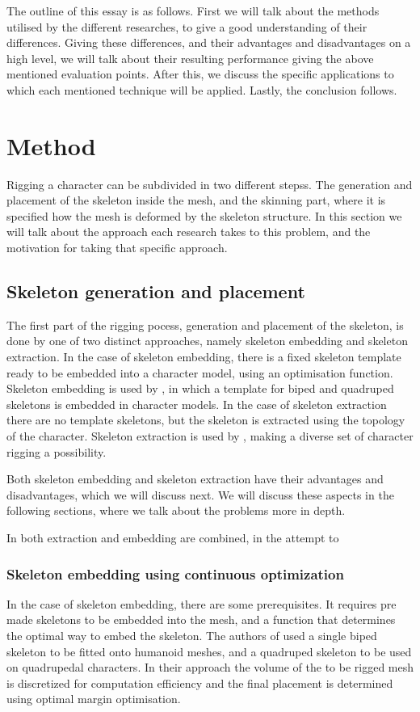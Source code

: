 \documentclass{article}
\begin{document}
The outline of this essay is as follows. First we will talk about the methods
utilised by the different researches, to give a good understanding of their
differences. Giving these differences, and their advantages and disadvantages on
a high level, we will talk about their resulting performance giving the above
mentioned evaluation points. After this, we discuss the specific applications to
which each mentioned technique will be applied. Lastly, the conclusion follows.

\section{Method}
Rigging a character can be subdivided in two different stepss. The generation
and placement of the skeleton inside the mesh, and the skinning part, where it
is specified how the mesh is deformed by the skeleton structure. In this section we will talk
about the approach each research takes to this problem, and the motivation for
taking that specific approach.

\subsection{Skeleton generation and placement}
The first part of the rigging pocess, generation and placement of the skeleton, 
is done by one of two distinct approaches, namely skeleton
embedding and skeleton extraction. In the case of skeleton embedding, there
is a fixed skeleton template ready to be embedded into a character model,
using an optimisation function. Skeleton embedding is used by
\citep{paper1}, in which a template for biped and quadruped skeletons is
embedded in character models. In the case of skeleton extraction there
are no template skeletons, but the skeleton is extracted using the
topology of the character. Skeleton extraction is used by \citep{paper2},
making a diverse set of character rigging a possibility.

Both skeleton embedding and skeleton extraction have their advantages and
disadvantages, which we will discuss next. We will discuss these aspects in
the following sections, where we talk about the problems more in depth. 

In \citep{paper3} both extraction and embedding are combined, in the attempt to    

\subsubsection{Skeleton embedding using continuous optimization}
In the case of skeleton embedding, there are some prerequisites. It requires pre
made skeletons to be embedded into the mesh, and a function that determines the
optimal way to embed the skeleton. 
The authors of \citep{paper1} used a single biped skeleton to be fitted onto
humanoid meshes, and a quadruped skeleton to be used on quadrupedal characters.
In their approach the volume of the to be rigged mesh is discretized for
computation efficiency and the final placement is determined using optimal
margin optimisation.
 
\end{document}
